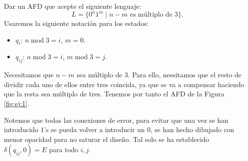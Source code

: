\documentclass[12pt]{article}
\begin{document}
    \begin{ejercicio} \label{ej:1}
        Dar un AFD que acepte el siguiente lenguaje:
        \begin{equation*}
            L=\{0^n1^m \mid n-m \text{ es múltiplo de } 3\}.
        \end{equation*}
        Usaremos la siguiente notación para los estados:
        \begin{itemize}
            \item $q_i$: $n \operatorname{mod} 3 = i$, $m=0$.
            \item $q_{ij}$: $n \operatorname{mod} 3 = i$, $m \operatorname{mod} 3 = j$.
        \end{itemize}

        Necesitamos que $n-m$ sea múltiplo de $3$. Para ello, neesitamos que el resto de dividir cada uno de ellos entre tres coincida, ya que se va a compensar haciendo que la resta sea múltiplo de tres. Tenemos por tanto el AFD de la Figura \ref{fig:ej:1}.

        Notemos que todas las conexiones de error, para evitar que una vez se han introducido $1$'s se pueda volver a introducir un $0$, se han hecho dibujado con menor opacidad para no saturar el diseño. Tal solo se ha establecido $\delta(q_{ij}, 0) = E$ para todo $i,j$.
        \begin{figure}[H]
            \centering
\end{figure}
\end{ejercicio}
\end{document}
